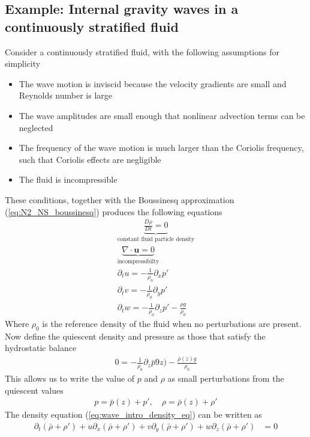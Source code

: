 \documentclass[a4paper, 12pt]{article}
\numberwithin{equation}{subsubsection}
\begin{document}
\subsection{Example: Internal gravity waves in a continuously stratified fluid}
Consider a continuously stratified fluid, with the following assumptions for simplicity
\begin{itemize}
	\item The wave motion is inviscid because the velocity gradients are small and Reynolds number is large
	\item The wave amplitudes are small enough that nonlinear advection terms can be neglected
	\item The frequency of the wave motion is much larger than the Coriolis frequency, such that Coriolis effects are negligible
	\item The fluid is incompressible
\end{itemize}
These conditions, together with the Boussinesq approximation (\ref{eq:N2_NS_boussinesq}) produces the following equations
\begin{align}
	\underbrace{\frac{D \rho}{D t} = 0}_\text{constant fluid particle density} \label{eq:wave_intro_density_eq} \\
	\underbrace{\nabla \cdot \mathbf{u} = 0}_\text{incompressibilty} \label{eq:wave_intro_incompressibilty_eq} \\
	\partial_t u = - \frac{1}{\rho_0} \partial_x p' \\
	\partial_t v = - \frac{1}{\rho_0} \partial_y p' \\
	\partial_t w = - \frac{1}{\rho_0} \partial_z p' - \frac{\rho g}{\rho_0} \label{eq:wave_intro_boussinesq_z}
\end{align}
Where $\rho_0$ is the reference density of the fluid when no perturbations are present. Now define the quiescent density and pressure as those that satisfy the hydrostatic balance
\begin{align}
	0 = - \frac{1}{\rho_0} \partial_z \bar{p}9z) - \frac{\bar{\rho}(z) g}{\rho_0}
\end{align}
This allows us to write the value of $p$ and $\rho$ as small perturbations from the quiescent values
\begin{align}
	p = \bar{p}(z) + p', \quad \rho = \bar{\rho}(z) + \rho'
\end{align}
The density equation (\ref{eq:wave_intro_density_eq}) can be written as
\begin{align}
	\partial_t (\bar{\rho} + \rho') + u \partial_x (\bar{\rho} + \rho') + v \partial_y (\bar{\rho} + \rho') + w \partial_z (\bar{\rho} + \rho') &= 0
\end{align}
\end{document}
